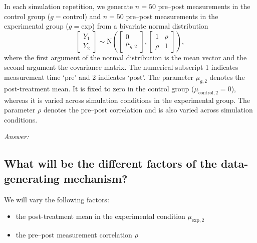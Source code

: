 \documentclass[12pt]{article}
\begin{document}
\begin{examplebox}
In each simulation repetition, we generate $n=50$ pre--post measurements in the control group ($g = \text{control}$) and $n = 50$ pre--post measurements in the experimental group ($g = \text{exp}$) from a bivariate normal distribution
\begin{equation}
    \label{eq:bivariateNormal}
    \left[\begin{array}{c}Y_1 \\ Y_2 \end{array}\right] \sim\text{N}\left(\left[\begin{array}{c}0 \\ \mu_{g,2} \end{array}\right],\left[\begin{array}{cc} 1 & \rho  \\ \rho & 1 \end{array}\right]\right),
\end{equation}
where the first argument of the normal distribution is the mean vector and the second argument the covariance matrix.
The numerical subscript 1 indicates measurement time `pre' and 2 indicates `post'. The parameter $\mu_{g,2}$ denotes the post-treatment mean. It is fixed to zero in the control group (${\mu_{\text{control},2}} = 0$), whereas it is varied across simulation conditions in the experimental group. The parameter $\rho$ denotes the pre--post correlation and is also varied across simulation conditions.
\end{examplebox}

\textit{Answer:}

\subsection{What will be the different factors of the data-generating mechanism?}


\begin{examplebox}
We will vary the following factors:
\begin{itemize}
    \item the post-treatment mean in the experimental condition ${\mu_{\text{exp},2}}$
    \item the pre--post measurement correlation $\rho$
\end{itemize}
\end{examplebox}
\end{document}
